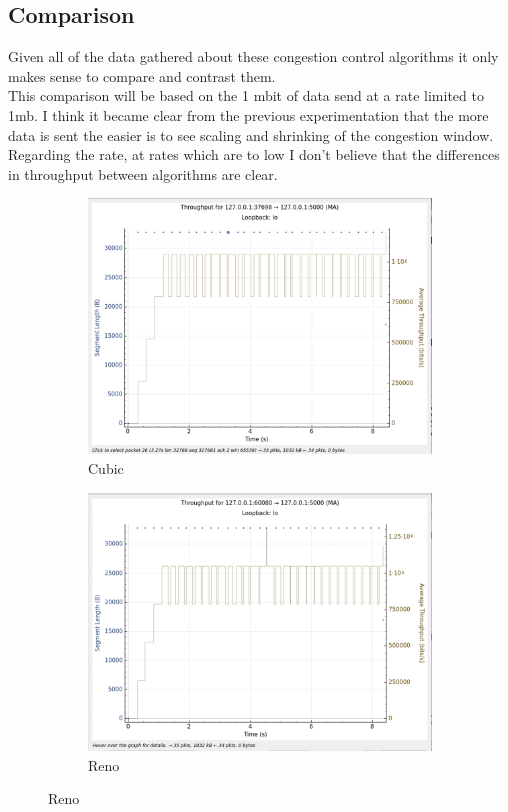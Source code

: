 \documentclass{report}
\begin{document}
\subsection*{Comparison}
Given all of the data gathered about these congestion control algorithms it only makes sense to compare and contrast them.\\
This comparison will be based on the 1 mbit of data send at a rate limited to 1mb. I think it became clear from the previous experimentation that the more data is sent the easier is to see scaling and shrinking of the congestion window. Regarding the rate, at rates which are to low  I don't believe that the differences in throughput between algorithms are clear.\\
\begin{figure}[H]
    \centering
    \begin{subfigure}[b]{0.45\textwidth}
        \centering
        \includegraphics[width=\textwidth]{Pics/Cubic/r1mbit_s1m_th}
        \caption{Cubic}
    \end{subfigure}
    \hfill
    \begin{subfigure}[b]{0.45\textwidth}
        \centering
        \includegraphics[width=\textwidth]{Pics/Reno/r1mbit_s1m_th}
        \caption{Reno}
    \end{subfigure}
    \medskip


\end{figure}
\end{document}
